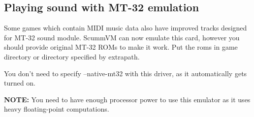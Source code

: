 

\subsection{Playing sound with MT-32 emulation}

Some games which contain MIDI music data also have improved tracks designed
for MT-32 sound module. ScummVM can now emulate this card, however you should
provide original MT-32 ROMs to make it work. Put the roms in game directory or
directory specified by extrapath.

You don't need to specify --native-mt32 with this driver, as it automatically
gets turned on.

\textbf{NOTE:} You need to have enough processor power to use this emulator as
 it uses heavy floating-point computations.
